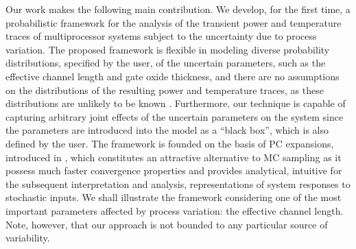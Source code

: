Our work makes the following main contribution.
We develop, for the first time, a probabilistic framework for the analysis of the transient power and temperature traces of multiprocessor systems subject to the uncertainty due to process variation.
The proposed framework is flexible in modeling diverse probability distributions, specified by the user, of the uncertain parameters, such as the effective channel length and gate oxide thickness, and there are no assumptions on the distributions of the resulting power and temperature traces, as these distributions are unlikely to be known \apriori.
Furthermore, our technique is capable of capturing arbitrary joint effects of the uncertain parameters on the system since the parameters are introduced into the model as a ``black box'', which is also defined by the user.
The framework is founded on the basis of PC expansions, introduced in , which constitutes an attractive alternative to MC sampling as it possess much faster convergence properties and provides analytical, intuitive for the subsequent interpretation and analysis, representations of system responses to stochastic inputs.
We shall illustrate the framework considering one of the most important parameters affected by process variation: the effective channel length.
Note, however, that our approach is not bounded to any particular source of variability.
